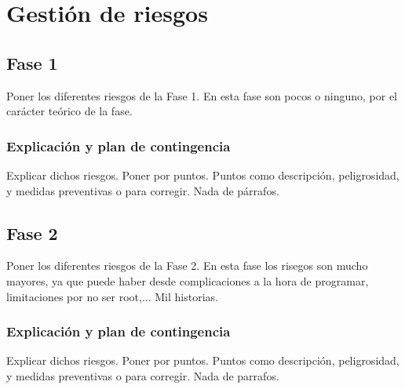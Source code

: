 
\section{Gestión de riesgos}

\subsection{Fase 1}
{\color{red} Poner los diferentes riesgos de la Fase 1. En esta fase son pocos o ninguno, por el carácter teórico de la fase.}

\subsubsection{Explicación y plan de contingencia}
{\color{red} Explicar dichos riesgos. Poner por puntos. Puntos como descripción, peligrosidad, y medidas preventivas o para corregir. Nada de párrafos.}

\subsection{Fase 2}
{\color{red} Poner los diferentes riesgos de la Fase 2. En esta fase los risegos son mucho mayores, ya que puede haber desde complicaciones a la hora de programar, limitaciones por no ser root,... Mil historias.}

\subsubsection{Explicación y plan de contingencia}
{\color{red} Explicar dichos riesgos. Poner por puntos. Puntos como descripción, peligrosidad, y medidas preventivas o para corregir. Nada de parrafos.}

